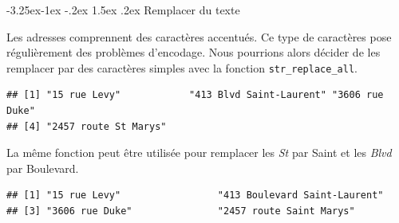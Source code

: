 \documentclass[
  11pt,
  french,
]{book}
\makeatletter
\newenvironment{Shaded}{\begin{snugshade}}{\end{snugshade}}
\newcommand{\DecValTok}[1]{\textcolor[rgb]{0.00,0.00,0.81}{#1}}
\newcommand{\KeywordTok}[1]{\textcolor[rgb]{0.13,0.29,0.53}{\textbf{#1}}}
\newcommand{\NormalTok}[1]{#1}
\newcommand{\OperatorTok}[1]{\textcolor[rgb]{0.81,0.36,0.00}{\textbf{#1}}}
\newcommand{\StringTok}[1]{\textcolor[rgb]{0.31,0.60,0.02}{#1}}
\newenvironment{kframe}{%
\medskip{}
\setlength{\fboxsep}{.8em}
 \def\at@end@of@kframe{}%
 \ifinner\ifhmode%
  \def\at@end@of@kframe{\end{minipage}}%
  \begin{minipage}{\columnwidth}%
 \fi\fi%
 \def\FrameCommand##1{\hskip\@totalleftmargin \hskip-\fboxsep
 \colorbox{shadecolor}{##1}\hskip-\fboxsep
     \hskip-\linewidth \hskip-\@totalleftmargin \hskip\columnwidth}%
 \MakeFramed {\advance\hsize-\width
   \@totalleftmargin\z@ \linewidth\hsize
   \@setminipage}}%
 {\par\unskip\endMakeFramed%
 \at@end@of@kframe}
\renewenvironment{Shaded}{\begin{kframe}}{\end{kframe}}
\renewcommand\paragraph{\@startsection{paragraph}{4}{\z@}%
   {-3.25ex\@plus -1ex \@minus -.2ex}%
   {1.5ex \@plus .2ex}%
   {\normalfont\normalsize\bfseries}}
\makeatother
\begin{document}
\hypertarget{sect014252}{%
\paragraph{Remplacer du texte}\label{sect014252}}

Les adresses comprennent des caractères accentués. Ce type de caractères pose régulièrement des problèmes d'encodage. Nous pourrions alors décider de les remplacer par des caractères simples avec la fonction \texttt{str\_replace\_all}.

\begin{Shaded}
\end{Shaded}

\begin{verbatim}
## [1] "15 rue Levy"            "413 Blvd Saint-Laurent" "3606 rue Duke"         
## [4] "2457 route St Marys"
\end{verbatim}

La même fonction peut être utilisée pour remplacer les \emph{St} par Saint et les \emph{Blvd} par Boulevard.

\begin{Shaded}
\end{Shaded}

\begin{verbatim}
## [1] "15 rue Levy"                 "413 Boulevard Saint-Laurent"
## [3] "3606 rue Duke"               "2457 route Saint Marys"
\end{verbatim}
\end{document}

